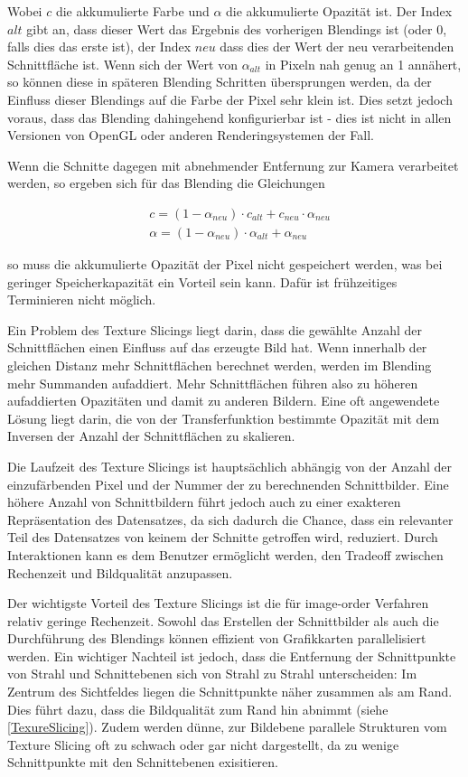 \documentclass[a4paper,fontsize=12pt,toc=bib,halfparskip,ngerman]{scrartcl}
\begin{document}
Wobei $c$ die akkumulierte Farbe und $\alpha$ die akkumulierte Opazit\"at ist. Der Index $alt$ gibt an, dass dieser Wert das Ergebnis des vorherigen Blendings ist (oder 0, falls dies das erste ist), der Index $neu$ dass dies der Wert der neu verarbeitenden Schnittfl\"ache ist. Wenn sich der Wert von $\alpha_{alt}$ in Pixeln nah genug an 1 ann\"ahert, so k\"onnen diese in sp\"ateren Blending Schritten \"ubersprungen werden, da der Einfluss dieser Blendings auf die Farbe der Pixel sehr klein ist. Dies setzt jedoch voraus, dass das Blending dahingehend konfigurierbar ist - dies ist nicht in allen Versionen von OpenGL oder anderen Renderingsystemen der Fall. 

Wenn die Schnitte dagegen mit abnehmender Entfernung zur Kamera verarbeitet werden, so ergeben sich f\"ur das Blending die Gleichungen

\begin{align}
&c = (1-\alpha_{neu})\cdot c_{alt}+c_{neu}\cdot\alpha_{neu}
\label{back-to-front-color}\\ 
&\alpha = (1-\alpha_{neu})\cdot\alpha_{alt} + \alpha_{neu}
\label{back-to-front-alpha}
\end{align}

so muss die akkumulierte Opazit\"at der Pixel nicht gespeichert werden, was bei geringer Speicherkapazit\"at ein Vorteil sein kann. Daf\"ur ist fr\"uhzeitiges Terminieren nicht m\"oglich.

Ein Problem des Texture Slicings liegt darin, dass die gew\"ahlte Anzahl der Schnittfl\"achen einen Einfluss auf das erzeugte Bild hat. Wenn innerhalb der gleichen Distanz mehr Schnittfl\"achen berechnet werden, werden im Blending mehr Summanden aufaddiert. Mehr Schnittfl\"achen f\"uhren also zu h\"oheren aufaddierten Opazit\"aten und damit zu anderen Bildern. Eine oft angewendete L\"osung liegt darin, die von der Transferfunktion bestimmte Opazit\"at mit dem Inversen der Anzahl der Schnittfl\"achen zu skalieren.

Die Laufzeit des Texture Slicings ist haupts\"achlich abh\"angig von der Anzahl der einzuf\"arbenden Pixel und der Nummer der zu berechnenden Schnittbilder. Eine h\"ohere Anzahl von Schnittbildern f\"uhrt jedoch auch zu einer exakteren Repr\"asentation des Datensatzes, da sich dadurch die Chance, dass ein relevanter Teil des Datensatzes von keinem der Schnitte getroffen wird, reduziert. Durch Interaktionen kann es dem Benutzer erm\"oglicht werden, den Tradeoff zwischen Rechenzeit und Bildqualit\"at anzupassen.

Der wichtigste Vorteil des Texture Slicings ist die f\"ur image-order Verfahren relativ geringe Rechenzeit. Sowohl das Erstellen der Schnittbilder als auch die Durchf\"uhrung des Blendings k\"onnen effizient von Grafikkarten parallelisiert werden. Ein wichtiger Nachteil ist jedoch, dass die Entfernung der Schnittpunkte von Strahl und Schnittebenen sich von Strahl zu Strahl unterscheiden: Im Zentrum des Sichtfeldes liegen die Schnittpunkte n\"aher zusammen als am Rand. Dies f\"uhrt dazu, dass die Bildqualit\"at zum Rand hin abnimmt (siehe \cref{TexureSlicing}). Zudem werden d\"unne, zur Bildebene parallele Strukturen vom Texture Slicing oft zu schwach oder gar nicht dargestellt, da zu wenige Schnittpunkte mit den Schnittebenen exisitieren.
\end{document}
